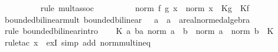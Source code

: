 \begin{isabellebody}
\ \ \ \ \ \ \ \ \isamarkupfalse%
\ {\isacharparenleft}{\kern0pt}rule\ mult{\isachardot}{\kern0pt}assoc{\isacharparenright}{\kern0pt}\isanewline
\ \ \ \ \ \ \isamarkupfalse%
\ \isamarkupfalse%
\ {\isachardoublequoteopen}norm\ {\isacharparenleft}{\kern0pt}f\ {\isacharparenleft}{\kern0pt}g\ x{\isacharparenright}{\kern0pt}{\isacharparenright}{\kern0pt}\ {\isasymle}\ norm\ x\ {\isacharasterisk}{\kern0pt}\ {\isacharparenleft}{\kern0pt}Kg\ {\isacharasterisk}{\kern0pt}\ Kf{\isacharparenright}{\kern0pt}{\isachardoublequoteclose}\ \isacommand{{\isachardot}{\kern0pt}}\isamarkupfalse%
\isanewline
\ \ \ \ \isamarkupfalse%
\isanewline
\ \ \isamarkupfalse%
\isanewline
{}\isamarkupfalse%
%
\endisatagproof
{\isafoldproof}%
%
\isadelimproof
\isanewline
%
\endisadelimproof
\isanewline
{}\isamarkupfalse%
\ bounded{\isacharunderscore}{\kern0pt}bilinear{\isacharunderscore}{\kern0pt}mult{\isacharcolon}{\kern0pt}\ {\isachardoublequoteopen}bounded{\isacharunderscore}{\kern0pt}bilinear\ {\isacharparenleft}{\kern0pt}{\isacharparenleft}{\kern0pt}{\isacharasterisk}{\kern0pt}{\isacharparenright}{\kern0pt}\ {\isacharcolon}{\kern0pt}{\isacharcolon}{\kern0pt}\ {\isacharprime}{\kern0pt}a\ {\isasymRightarrow}\ {\isacharprime}{\kern0pt}a\ {\isasymRightarrow}\ {\isacharprime}{\kern0pt}a{\isacharcolon}{\kern0pt}{\isacharcolon}{\kern0pt}real{\isacharunderscore}{\kern0pt}normed{\isacharunderscore}{\kern0pt}algebra{\isacharparenright}{\kern0pt}{\isachardoublequoteclose}\isanewline
%
\isadelimproof
%
\endisadelimproof
%
\isatagproof
{}\isamarkupfalse%
\ {\isacharparenleft}{\kern0pt}rule\ bounded{\isacharunderscore}{\kern0pt}bilinear{\isachardot}{\kern0pt}intro{\isacharparenright}{\kern0pt}\isanewline
\ \ \isamarkupfalse%
\ {\isachardoublequoteopen}{\isasymexists}K{\isachardot}{\kern0pt}\ {\isasymforall}a\ b{\isacharcolon}{\kern0pt}{\isacharcolon}{\kern0pt}{\isacharprime}{\kern0pt}a{\isachardot}{\kern0pt}\ norm\ {\isacharparenleft}{\kern0pt}a\ {\isacharasterisk}{\kern0pt}\ b{\isacharparenright}{\kern0pt}\ {\isasymle}\ norm\ a\ {\isacharasterisk}{\kern0pt}\ norm\ b\ {\isacharasterisk}{\kern0pt}\ K{\isachardoublequoteclose}\isanewline
\ \ \ \ \isamarkupfalse%
\ {\isacharparenleft}{\kern0pt}rule{\isacharunderscore}{\kern0pt}tac\ x{\isacharequal}{\kern0pt}{}\ \ exI{\isacharparenright}{\kern0pt}\ {\isacharparenleft}{\kern0pt}simp\ add{\isacharcolon}{\kern0pt}\ norm{\isacharunderscore}{\kern0pt}mult{\isacharunderscore}{\kern0pt}ineq{\isacharparenright}{\kern0pt}\isanewline

\end{isabellebody}
